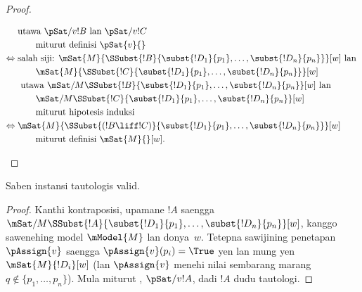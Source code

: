 \documentclass[../../../include/open-logic-section]{subfiles}
\begin{document}
\begin{proof}
\begin{enumerate}
{{\begin{align*}
        & \text{utawa } \pSat/{v}{!B} \text{ lan } \pSat/{v}{!C}\\
        &\qquad \text{miturut definisi $\pSat{v}{}$}\\
        \Leftrightarrow {} &
        \text{salah siji: } \mSat{M}{\SSubst{!B}{\subst{!D_1}{p_1}, \dots,
            \subst{!D_n}{p_n}}}[w] \text{ lan }\\
        & \qquad \mSat{M}{\SSubst{!C}{\subst{!D_1}{p_1}, \dots,
          \subst{!D_n}{p_n}}}[w]\\ 
        &  \text{ utawa } \mSat/{M}{\SSubst{!B}{\subst{!D_1}{p_1}, \dots,
            \subst{!D_n}{p_n}}}[w] \text{ lan }\\
        & \qquad \mSat/{M}{\SSubst{!C}{\subst{!D_1}{p_1}, \dots,
          \subst{!D_n}{p_n}}}[w]\\
        &\qquad\text{miturut hipotesis induksi}\\
        \Leftrightarrow {} &
        \mSat{M}{\SSubst{(!B \liff !C)}{\subst{!D_1}{p_1}, \dots,
          \subst{!D_n}{p_n}}}[w]\\
        &\qquad \text{miturut definisi $\mSat{M}{}[w]$}.
      \end{align*}}}{}
  \end{enumerate}
  \end{proof}

\begin{prop}
  Saben instansi tautologis valid.
\end{prop}

\begin{proof}
  Kanthi kontraposisi, upamane $!A$ saengga
  $\mSat/{M}{\SSubst{!A}{\subst{!D_1}{p_1}, \dots,
  \subst{!D_n}{p_n}}}[w]$, kanggo sawenehing model $\mModel{M}$ lan donya~$w$.
  Tetepna sawijining penetapan $\pAssign{v}$ saengga $\pAssign{v}(p_i) =
  \True$ yen lan mung yen $\mSat{M}{!D_i}[w]$ (lan $\pAssign{v}$ menehi
  nilai sembarang marang $q \notin \{p_1, \dots, p_n \}$). Mula miturut
  , $\pSat/{v}{!A}$, dadi $!A$ dudu tautologi.
\end{proof}
\end{document}
